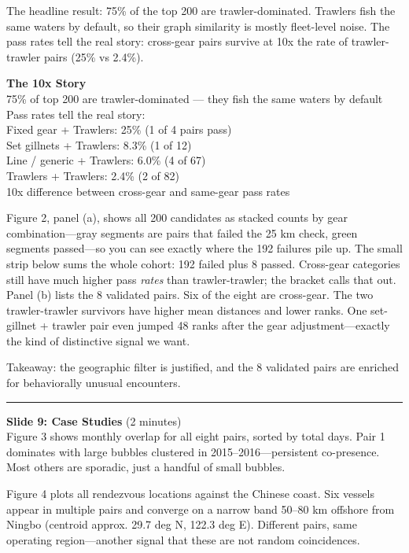 \documentclass[
]{article}
\begin{document}
The headline result: 75\% of the top 200 are trawler-dominated. Trawlers
fish the same waters by default, so their graph similarity is mostly
fleet-level noise. The pass rates tell the real story: cross-gear pairs
survive at 10x the rate of trawler-trawler pairs (25\% vs 2.4\%).

\textbf{The 10x Story}\\
75\% of top 200 are trawler-dominated --- they fish the same waters by
default\\
Pass rates tell the real story:\\
Fixed gear + Trawlers: 25\% (1 of 4 pairs pass)\\
Set gillnets + Trawlers: 8.3\% (1 of 12)\\
Line / generic + Trawlers: 6.0\% (4 of 67)\\
Trawlers + Trawlers: 2.4\% (2 of 82)\\
10x difference between cross-gear and same-gear pass rates

Figure 2, panel (a), shows all 200 candidates as stacked counts by gear
combination---gray segments are pairs that failed the 25 km check, green
segments passed---so you can see exactly where the 192 failures pile up.
The small strip below sums the whole cohort: 192 failed plus 8 passed.
Cross-gear categories still have much higher pass \emph{rates} than
trawler-trawler; the bracket calls that out. Panel (b) lists the 8
validated pairs. Six of the eight are cross-gear. The two
trawler-trawler survivors have higher mean distances and lower ranks.
One set-gillnet + trawler pair even jumped 48 ranks after the gear
adjustment---exactly the kind of distinctive signal we want.

Takeaway: the geographic filter is justified, and the 8 validated pairs
are enriched for behaviorally unusual encounters.

\begin{center}\rule{0.5\linewidth}{0.5pt}\end{center}

\textbf{Slide 9: Case Studies} (2 minutes)\\
Figure 3 shows monthly overlap for all eight pairs, sorted by total
days. Pair 1 dominates with large bubbles clustered in
2015--2016---persistent co-presence. Most others are sporadic, just a
handful of small bubbles.

Figure 4 plots all rendezvous locations against the Chinese coast. Six
vessels appear in multiple pairs and converge on a narrow band 50--80 km
offshore from Ningbo (centroid approx. 29.7 deg N, 122.3 deg E).
Different pairs, same operating region---another signal that these are
not random coincidences.
\end{document}
